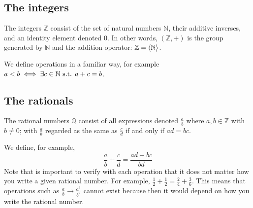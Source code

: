 \subsection{The integers}
The integers \(\mathbb Z\) consist of the set of natural numbers \(\mathbb N\), their additive inverses, and an identity element denoted 0.
In other words, \((\mathbb Z, +)\) is the group generated by \(\mathbb N\) and the addition operator: \(\mathbb Z = \left\langle{} \mathbb N \right\rangle\).

We define operations in a familiar way, for example \(a < b \iff \exists c \in \mathbb N \text{ s.t. } a+c = b\).

\subsection{The rationals}
The rational numbers \(\mathbb Q\) consist of all expressions denoted \(\frac{a}{b}\) where \(a, b \in \mathbb Z\) with \(b \neq 0\); with \(\frac{a}{b}\) regarded as the same as \(\frac{c}{d}\) if and only if \(ad=bc\).

We define, for example,
\[
	\frac{a}{b} + \frac{c}{d} = \frac{ad + bc}{bd}
\]
Note that is important to verify with each operation that it does not matter how you write a given rational number.
For example, \(\frac{1}{2} + \frac{1}{2} = \frac{2}{4} + \frac{3}{6}\).
This means that operations such as \(\frac{a}{b} \to \frac{a^3}{b^2}\) cannot exist because then it would depend on how you write the rational number.
